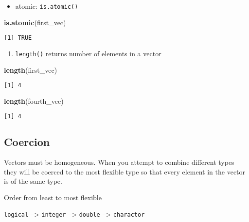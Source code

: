 \documentclass[
]{book}
\newenvironment{Shaded}{\begin{snugshade}}{\end{snugshade}}
\newcommand{\KeywordTok}[1]{\textcolor[rgb]{0.13,0.29,0.53}{\textbf{#1}}}
\newcommand{\NormalTok}[1]{#1}
\providecommand{\tightlist}{%
  \setlength{\itemsep}{0pt}\setlength{\parskip}{0pt}}
\begin{document}
\begin{itemize}
\tightlist
\item
  atomic: \texttt{is.atomic()}
\end{itemize}

\begin{Shaded}
\begin{Highlighting}[]
\KeywordTok{is.atomic}\NormalTok{(first_vec)}
\end{Highlighting}
\end{Shaded}

\begin{verbatim}
[1] TRUE
\end{verbatim}

\begin{enumerate}
\def\labelenumi{\arabic{enumi}.}
\setcounter{enumi}{2}
\tightlist
\item
  \texttt{length()} returns number of elements in a vector
\end{enumerate}

\begin{Shaded}
\begin{Highlighting}[]
\KeywordTok{length}\NormalTok{(first_vec)}
\end{Highlighting}
\end{Shaded}

\begin{verbatim}
[1] 4
\end{verbatim}

\begin{Shaded}
\begin{Highlighting}[]
\KeywordTok{length}\NormalTok{(fourth_vec)}
\end{Highlighting}
\end{Shaded}

\begin{verbatim}
[1] 4
\end{verbatim}

\hypertarget{coercion}{%
\subsection{Coercion}\label{coercion}}

Vectors must be homogeneous. When you attempt to combine different types they will be coerced to the most flexible type so that every element in the vector is of the same type.

Order from least to most flexible

\texttt{logical} --\textgreater{} \texttt{integer} --\textgreater{} \texttt{double} --\textgreater{} \texttt{charactor}
\end{document}
